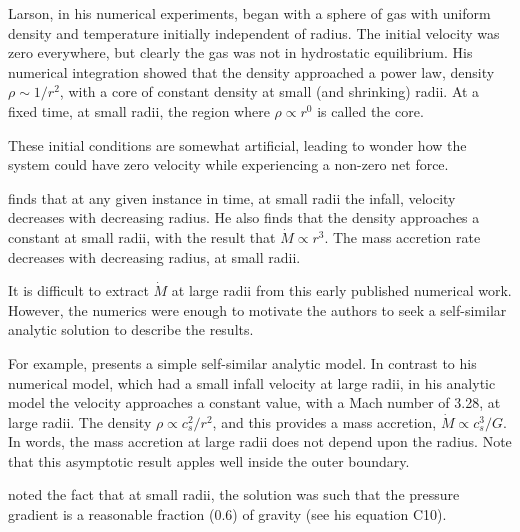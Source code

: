 \documentclass[../dissertation.tex]{subfiles}
\begin{document}
Larson, in his numerical experiments, began with a sphere of gas with  uniform density and temperature initially independent of radius. 
The initial velocity was zero everywhere, but clearly the gas was not in hydrostatic equilibrium. His numerical integration showed that the density approached a power law, density $\rho\sim 1/r^2$, with a core of constant density at small (and shrinking) radii. At a fixed time, at small radii, the region where $\rho \propto r^0$ is called the core. 

These initial conditions are somewhat artificial, leading \citet{1977ApJ...214..488S} to wonder how the system could have zero velocity while experiencing a non-zero net force.



\citet{1969MNRAS.145..271L} finds that at any given instance in time, at small radii the infall, velocity decreases with decreasing radius.
He also finds that the density approaches a constant at small radii, with the result that $\dot{M} \propto r^3 $. 
The mass accretion rate decreases with decreasing radius, at small radii.

It is difficult to extract $\dot M$ at large radii from this early published numerical work.
However, the numerics were enough to motivate the authors to seek a self-similar analytic solution to describe the results.

For example, \citet{1969MNRAS.145..271L} presents a simple self-similar analytic model. In contrast to his numerical model, which had a small infall velocity at large radii, in his analytic model  the velocity approaches a constant value, with a Mach number of 3.28, at large radii.
The density $\rho \propto c_s^2 / r^2$, and this provides a mass accretion, $\dot{M} \propto c_s^3 / G$. In words, the mass accretion at large radii does not depend upon the radius. 
Note that this asymptotic result apples well inside the outer boundary.

\citet{1969MNRAS.145..271L} noted the fact that at small radii, the solution was such that the pressure gradient is a reasonable fraction (0.6) of gravity (see his equation C10). 
\end{document}

